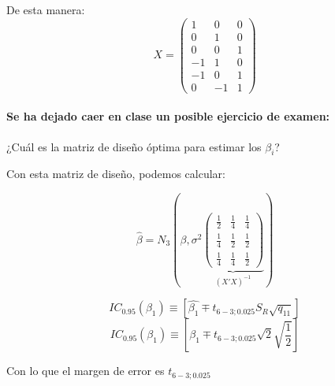 \begin{problem}[14]
De esta manera: 
\[
X = \begin{pmatrix}
1&0&0\\
0&1&0\\
0&0&1\\
-1&1&0\\
-1&0&1\\
0&-1&1
\end{pmatrix}
\]


\paragraph{Se ha dejado caer en clase un posible ejercicio de examen: } ¿Cuál es la matriz de diseño óptima para estimar los $β_i$?

\ppart Con esta matriz de diseño, podemos calcular:

\[
\hat{β} = N_3\left(β, σ^2\underbrace{\begin{pmatrix} 
\frac{1}{2} & \frac{1}{4} & \frac{1}{4}\\
\frac{1}{4} & \frac{1}{2} & \frac{1}{2}\\
\frac{1}{4} & \frac{1}{4} & \frac{1}{2}
\end{pmatrix}}_{(X'X)^{-1}}  \right)
\]

\ppart 

\[ IC_{0.95}(β_1) \equiv \left[\hat{β_1} \mp t_{6-3;0.025}S_R\sqrt{q_{11}} \right]\]
\[ IC_{0.95}(β_1) \equiv \left[\hat{β_1} \mp t_{6-3;0.025}\sqrt{2}\sqrt{\frac{1}{2}} \right]\]

Con lo que el margen de error es $t_{6-3;0.025}$

\end{problem}

